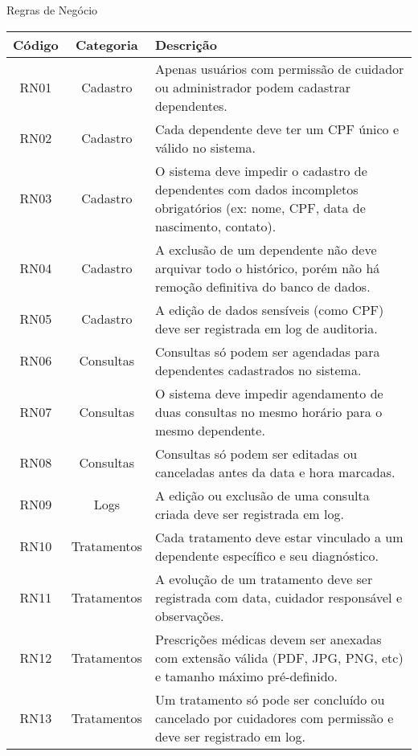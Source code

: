 \begin{quadro}
    \caption{\label{quadro_regras_negocio}Regras de Negócio}
    \begin{tabular}{|c|c|p{10cm}|}
        \hline
        \textbf{Código} & \textbf{Categoria} & \textbf{Descrição} \\ \hline
        RN01   & Cadastro                       & Apenas usuários com permissão de cuidador ou administrador podem cadastrar dependentes. \\ \hline
        RN02   & Cadastro                       & Cada dependente deve ter um CPF único e válido no sistema. \\ \hline
        RN03   & Cadastro                       & O sistema deve impedir o cadastro de dependentes com dados incompletos obrigatórios (ex: nome, CPF, data de nascimento, contato). \\ \hline
        RN04   & Cadastro                       & A exclusão de um dependente não deve arquivar todo o histórico, porém não há remoção definitiva do banco de dados. \\ \hline
        RN05   & Cadastro                       & A edição de dados sensíveis (como CPF) deve ser registrada em log de auditoria. \\ \hline
        RN06   & Consultas                     & Consultas só podem ser agendadas para dependentes cadastrados no sistema. \\ \hline
        RN07   & Consultas                     & O sistema deve impedir agendamento de duas consultas no mesmo horário para o mesmo dependente. \\ \hline
        RN08   & Consultas                     & Consultas só podem ser editadas ou canceladas antes da data e hora marcadas. \\ \hline
        RN09   & Logs                          & A edição ou exclusão de uma consulta criada deve ser registrada em log. \\ \hline
        RN10   & Tratamentos                   & Cada tratamento deve estar vinculado a um dependente específico e seu diagnóstico. \\ \hline
        RN11   & Tratamentos                   & A evolução de um tratamento deve ser registrada com data, cuidador responsável e observações. \\ \hline
        RN12   & Tratamentos                   & Prescrições médicas devem ser anexadas com extensão válida (PDF, JPG, PNG, etc) e tamanho máximo pré-definido. \\ \hline
        RN13   & Tratamentos                   & Um tratamento só pode ser concluído ou cancelado por cuidadores com permissão e deve ser registrado em log. \\ \hline

\end{tabular}
\end{quadro}
